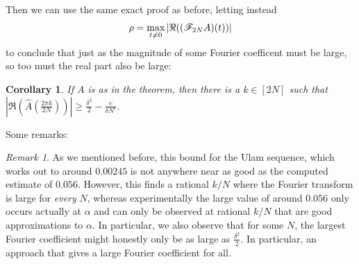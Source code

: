 \documentclass{article}
\newtheorem{corollary}{Corollary}[theorem]
\theoremstyle{definition}
\theoremstyle{remark}
\newtheorem{remark}{Remark}
\numberwithin{equation}{section}
\begin{document}
Then we can use the same exact proof as before, letting instead
\[\rho = \max_{t \neq 0} |\Re((\mathscr{F}_{2N}A)(t))|\] to conclude that
just as the magnitude of some Fourier coefficent must be large, so too
must the real part also be large:

\begin{corollary}\label{thm:alpha_real}
  If $A$ is as in the theorem, then there is a $k \in [2N]$ such that
  $|\Re(\widehat{A}(\frac{2\pi k}{2N}))| \geq \frac{\delta^2}{2} -
  \frac{c}{\delta N^\epsilon}$.
\end{corollary}

Some remarks: 

\begin{remark}
  As we mentioned before, this bound for the Ulam sequence, which
  works out to around $0.00245$ is not anywhere near as good as the
  computed estimate of $0.056$.  However, this finds a rational $k/N$
  where the Fourier transform is large for \textit{every} $N$, whereas
  experimentally the large value of around $0.056$ only occurs
  actually at $\alpha$ and can only be observed at rational $k/N$ that
  are good approximations to $\alpha$.  In particular, we also observe
  that for some $N$, the largest Fourier coefficient might honestly
  only be as large as $\frac{\delta^2}{2}$.  In particular, an
  approach that gives a large Fourier coefficient for all.
\end{remark}

\end{document}
